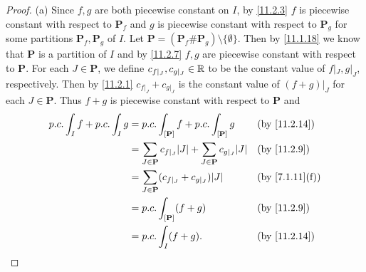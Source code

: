 \begin{proof}{(a)}
  Since \(f, g\) are both piecewise constant on \(I\), by \cref{11.2.3} \(f\) is piecewise constant with respect to \(\mathbf{P}_f\) and \(g\) is piecewise constant with respect to \(\mathbf{P}_g\) for some partitions \(\mathbf{P}_f, \mathbf{P}_g\) of \(I\).
  Let \(\mathbf{P} = (\mathbf{P}_f \# \mathbf{P}_g) \setminus \{\emptyset\}\).
  Then by \cref{11.1.18} we know that \(\mathbf{P}\) is a partition of \(I\) and by \cref{11.2.7} \(f, g\) are piecewise constant with respect to \(\mathbf{P}\).
  For each \(J \in \mathbf{P}\), we define \(c_{f|_J}, c_{g|_J} \in \mathbb{R}\) to be the constant value of \(f|_J, g|_J\), respectively.
  Then by \cref{11.2.1} \(c_{f|_J} + c_{g|_J}\) is the constant value of \((f + g)|_J\) for each \(J \in \mathbf{P}\).
  Thus \(f + g\) is piecewise constant with respect to \(\mathbf{P}\) and
  \begin{align*}
    p.c. \int_I f + p.c. \int_I g & = p.c. \int_{[\mathbf{P}]} f + p.c. \int_{[\mathbf{P}]} g                             &  & \text{(by \cref{11.2.14})}   \\
                                  & = \sum_{J \in \mathbf{P}} c_{f|_J} \abs{J} + \sum_{J \in \mathbf{P}} c_{g|_J} \abs{J} &  & \text{(by \cref{11.2.9})}    \\
                                  & = \sum_{J \in \mathbf{P}} (c_{f|_J} + c_{g|_J}) \abs{J}                               &  & \text{(by \cref{7.1.11}(f))} \\
                                  & = p.c. \int_{[\mathbf{P}]} (f + g)                                                    &  & \text{(by \cref{11.2.9})}    \\
                                  & = p.c. \int_I (f + g).                                                                &  & \text{(by \cref{11.2.14})}
  \end{align*}
\end{proof}


